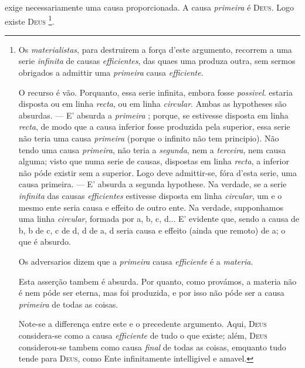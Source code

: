  exige necessariamente uma causa proporcionada. A causa \emph{primeira} é \textsc{Deus}. Logo existe \textsc{Deus} \footnote{Os \emph{materialistas}, para destruirem a força d'este argumento, recorrem a uma serie \emph{infinita} de causas \emph{efficientes}, das quaes uma produza outra, sem sermos obrigados a admittir uma \emph{primeira} causa \emph{efficiente}.\par O recurso é vão. Porquanto, essa serie infinita, embora fosse \emph{possivel}. estaria disposta ou em linha \emph{recta}, ou em linha \emph{circular}. Ambas as hypotheses são absurdas. --- E' absurda a \emph{primeira} ; porque, se estivesse disposta em linha \emph{recta}, de modo que a causa inferior fosse produzida pela superior, essa serie não teria uma causa \emph{primeira} (porque o infinito não tem principio). Não tendo uma causa \emph{primeira}, não teria a \emph{segunda}, nem a \emph{terceira}, nem causa alguma; visto que numa serie de causas, dispostas em linha \emph{recta}, a inferior não póde existir sem a superior. Logo deve admittir-se, fóra d'esta serie, uma causa primeira. --- E' absurda a segunda hypothese. Na verdade, se a serie \emph{infinita} das causas \emph{efficientes} estivesse disposta em linha \emph{circular}, um e o mesmo ente seria causa e effeito de outro ente. Na verdade, supponhamos uma linha \emph{circular}, formada por a, b, c, d... E' evidente que, sendo a causa de b, b de c, c de d, d de a, d seria causa e effeito (ainda que remoto) de a; o que é absurdo.\par Os adversarios dizem que a \emph{primeira} causa \emph{efficiente} é a \emph{materia}.\par Esta asserção tambem é absurda. Por quanto, como provámos, a materia não é nem póde ser eterna, mas foi produzida, e por isso não póde ser a causa \emph{primeira} de todas as coisas.\par Note-se a differença entre este e o precedente argumento. Aqui, \textsc{Deus} considera-se como a causa \emph{efficiente} de tudo o que existe; além, \textsc{Deus} considerou-se tambem como causa \emph{final} de todas as coisas, emquanto tudo tende para \textsc{Deus}, como Ente infinitamente intelligivel e amavel.}.

